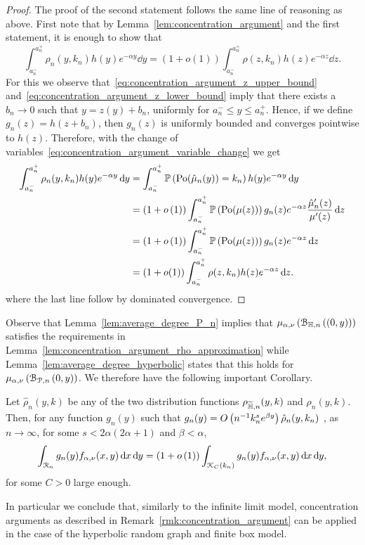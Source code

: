 \begin{proof}
The proof of the second statement follows the same line of reasoning as above. First note that by Lemma~\ref{lem:concentration_argument} and the first statement, it is enough to show that
\[
	\int_{a_n^-}^{a_n^+} \rho_n(y,k_n) h(y) e^{-\alpha y} \dd y
	= \left(1 + o(1)\right) \int_{a_n^-}^{a_n^+} \rho(z,k_n) h(z) e^{-\alpha z} \dd z.
\] 
For this we observe that~\eqref{eq:concentration_argument_z_upper_bound} and~\eqref{eq:concentration_argument_z_lower_bound} imply that there exists a $b_n \to 0$ such that $y = z(y) + b_n$, uniformly for $a_n^- \le y \le a_n^+$. Hence, if we define $g_n(z) = h(z + b_n)$, then $g_n(z)$ is uniformly bounded and converges pointwise to $h(z)$. Therefore, with the change of variables~\eqref{eq:concentration_argument_variable_change} we get
\begin{align*}
	\int_{a_n^-}^{a_n^+} \rho_n(y,k_n) h(y) e^{-\alpha y} \operatorname{\mathrm{d}\hspace{-2pt}} y
	&=  \int_{a_n^-}^{a_n^+} \mathbb{P}\left({\mathrm{Po}}(\hat{\mu}_n(y)) = k_n\right) h(y) e^{-\alpha y} \operatorname{\mathrm{d}\hspace{-2pt}} y\\
	&= (1 + o\left(1\right))\int_{a_n^-}^{a_n^+}  \mathbb{P}\left({\mathrm{Po}}(\mu(z))\right)
		g_n(z) e^{-\alpha z} \frac{\hat{\mu}_n^\prime(z)}{\mu^{\prime}(z)} \operatorname{\mathrm{d}\hspace{-2pt}} z\\
	&= (1 + o\left(1\right))\int_{a_n^-}^{a_n^+}  \mathbb{P}\left({\mathrm{Po}}(\mu(z))\right)
		g_n(z) e^{-\alpha z} \operatorname{\mathrm{d}\hspace{-2pt}} z\\
	&= \left(1 + o(1)\right) \int_{a_n^-}^{a_n^+} \rho(z,k_n) h(z) e^{-\alpha z} \operatorname{\mathrm{d}\hspace{-2pt}} z.
\end{align*}
where the last line follow by dominated convergence.
\end{proof}

Observe that Lemma~\ref{lem:average_degree_P_n} implies that $\mu_{\alpha,\nu}\left({\mathcal B}_{\mathbb{H},n}\left((0,y)\right)\right)$ satisfies the requirements in Lemma~\ref{lem:concentration_argument_rho_approximation} while Lemma~\ref{lem:average_degree_hyperbolic} states that this holds for $\mu_{\alpha,\nu}\left({\mathcal B}_{{\mathcal P},n}\left(0,y\right)\right)$. We therefore have the following important Corollary.

\begin{corollary}\label{cor:concentration_argument_other_models}
Let $\hat{\rho}_n(y,k)$ be any of the two distribution functions $\rho_{\widetilde{\mathbb{H}},n}(y,k)$ and $\rho_{n}(y,k)$. Then, for any function $g_n(y)$ such that $g_n(y) = O\left(n^{-1} k_n^{s} e^{\beta y}\right)\hat{\rho}_n(y,k_n)$ , as $n \to \infty$, for some $s < 2\alpha(2\alpha + 1)$ and $\beta < \alpha$,
\[
	\int_{{\mathcal R}_n} g_n(y) f_{\alpha,\nu}(x,y) \operatorname{\mathrm{d}\hspace{-2pt}} x \operatorname{\mathrm{d}\hspace{-2pt}} y
	= (1+o\left(1\right))\int_{{\mathcal K}_C(k_n)} g_n(y) f_{\alpha,\nu}(x,y) \operatorname{\mathrm{d}\hspace{-2pt}} x \operatorname{\mathrm{d}\hspace{-2pt}} y,
\]
for some $C > 0$ large enough.
\end{corollary}

In particular we conclude that, similarly to the infinite limit model, concentration arguments as described in Remark~\ref{rmk:concentration_argument} can be applied in the case of the hyperbolic random graph and finite box model.



